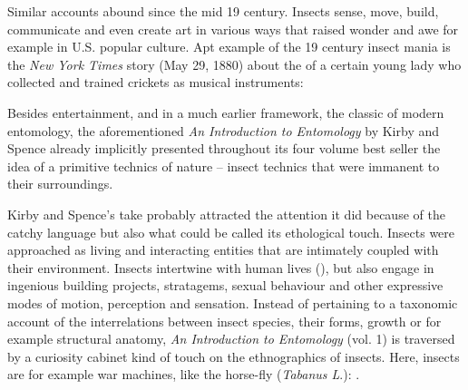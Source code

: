 {Similar accounts abound since the mid 19 century. Insects sense, move,
build, communicate and even create art in various ways that raised
wonder and awe for example in U.S. popular culture. Apt example of the
19 century insect mania is the {\em New York Times} story (May 29,
1880) about the  of a certain young lady who collected
and trained crickets as musical instruments:

{}

Besides entertainment, and in a much earlier framework, the classic of
modern entomology, the aforementioned {\em An Introduction to
Entomology} by Kirby and Spence already implicitly presented throughout
its four volume best seller the idea of a primitive technics of nature
{--} insect technics that were immanent to their surroundings. 

Kirby and Spence's take probably attracted the attention it did because
of the catchy language but also what could be called its ethological
touch. Insects were approached as living and interacting entities that
are intimately coupled with their environment. Insects intertwine with
human lives (), but also engage in ingenious building projects,
stratagems, sexual behaviour and other expressive modes of motion,
perception and sensation. Instead of pertaining to a taxonomic account
of the interrelations between insect species, their forms, growth or
for example structural anatomy, {\em An Introduction to Entomology}
(vol. 1) is traversed by a curiosity cabinet kind of touch on the
ethnographics of insects. Here, insects are for example war machines,
like the horse{}-fly ({\em Tabanus L}.): . 

}
